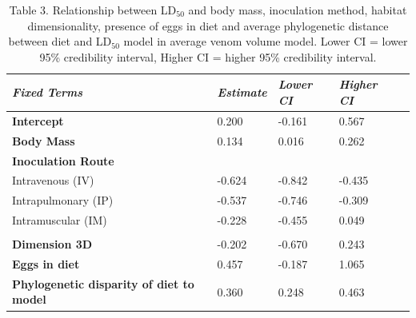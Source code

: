 \begin{table}[H]
  \centering
    \caption*{Table 3. Relationship between LD$_{50}$ and body mass, inoculation method, habitat dimensionality, presence of eggs in diet and average phylogenetic distance between diet and LD$_{50}$ model in average venom volume model. Lower CI = lower 95\% credibility interval, Higher CI = higher 95\% credibility interval.}
\begin{tabular}{*5l}    \toprule
\emph{Fixed Terms} & \emph{Estimate} & \emph{Lower CI} & \emph{Higher CI}\\\midrule
\textbf{Intercept} & 0.200  & -0.161 & 0.567 \\ 
\textbf{Body Mass} & 0.134  & 0.016 & 0.262 \\ 
\textbf{Inoculation Route} &  &  &  \\ 
 Intravenous (IV) & -0.624 & -0.842 & -0.435 \\
 Intrapulmonary (IP) & -0.537 & -0.746 & -0.309 \\ 
 Intramuscular (IM) & -0.228 & -0.455 & 0.049 \\
  &  &  &  \\ 
\textbf{Dimension 3D} & -0.202 & -0.670 & 0.243 \\ 
\textbf{Eggs in diet} & 0.457 & -0.187 & 1.065 \\ 
\textbf{Phylogenetic disparity of diet to model} & 0.360 & 0.248 & 0.463 \\\bottomrule
 \hline
\end{tabular}
  \label{tbl:Table 3.}
\end{table}






